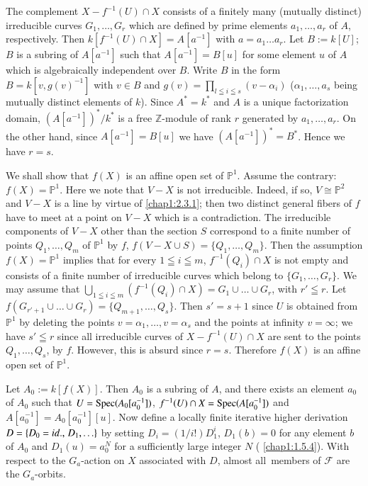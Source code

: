 The complement $X-f^{-1}(U)\cap X$ consists of a finitely many
(mutually distinct) irreducible curves $G_{1},\ldots,G_{r}$ which are
defined by prime elements $a_{1},\ldots,a_{r}$ of $A$,
respectively. Then $k[f^{-1}(U)\cap X]=A[a^{-1}]$ with $a=a_{1}\ldots
a_{r}$. Let $B:=k[U]$; $B$ is a subring of $A[a^{-1}]$ such that
$A[a^{-1}]=B[u]$ for some element $u$ of $A$ which is algebraically
independent over $B$. Write $B$ in the form $B=k[v,g(v)^{-1}]$ with
$v\in B$ and $g(v)=\prod\limits_{l\leqq i\leqq s}(v-\alpha_{i})$
($\alpha_{1},\ldots,a_{s}$ being mutually distinct elements of
$k$). Since $A^{\ast}=k^{\ast}$ and $A$ is a unique factorization
domain, $(A[a^{-1}])^{\ast}/k^{\ast}$ is a free $\mathbb{Z}$-module of
rank $r$ generated by $a_{1},\ldots,a_{r}$. On the other hand, since
$A[a^{-1}]=B[u]$ we have $(A[a^{-1}])^{\ast}=B^{\ast}$. Hence we have
$r=s$.\pageoriginale\ 

We shall show that $f(X)$ is an affine open set of
$\mathbb{P}^{1}$. Assume the contrary: $f(X)=\mathbb{P}^{1}$. Here we
note that $V-X$ is not irreducible. Indeed, if so, $V\cong
\mathbb{P}^{2}$ and $V-X$ is a line by virtue of \ref{chap1:2.3.1}; then two
distinct general fibers of $f$ have to meet at a point on $V-X$ which
is a contradiction. The irreducible components of $V-X$ other than the
section $S$ correspond to a finite number of points
$Q_{1},\ldots,Q_{m}$ of $\mathbb{P}^{1}$ by $f$, \iec $f(V-X\cup
S)=\{Q_{1},\ldots,Q_{m}\}$. Then the assumption $f(X)=\mathbb{P}^{1}$
implies that for every $1\leqq i\leqq m$, $f^{-1}(Q_{i})\cap X$ is not
empty and consists of a finite number of irreducible curves which
belong to $\{G_{1},\ldots,G_{r}\}$. We may assume that
$\bigcup\limits_{1\leqq i\leqq m}(f^{-1}(Q_{i})\cap
X)=G_{1}\cup\ldots\cup G_{r}$, with $r'\leqq r$. Let
$f(G_{r'+1}\cup\ldots\cup G_{r})=\{Q_{m+1},\ldots,Q_{s}\}$. Then
$s'=s+1$ since $U$ is obtained from $\mathbb{P}^{1}$ by deleting the
points $v=\alpha_{1},\ldots,v=\alpha_{s}$ and the points at infinity
$v=\infty$; we have $s'\leqq r$ since all irreducible curves of
$X-f^{-1}(U)\cap X$ are sent to the points $Q_{1},\ldots,Q_{s}$, by
$f$. However, this is absurd since $r=s$. Therefore $f(X)$ is an
affine open set of $\mathbb{P}^{1}$.

Let $A_{0}:=k[f(X)]$. Then $A_{0}$ is a subring of $A$, and there
exists an element $a_{0}$ of $A_{0}$ such that
$U=\operatorname{Spec}(A_{0}[a^{-1}_{0}])$, $f^{-1}(U)\cap X=\operatorname{Spec}(A[a^{-1}_{0}])$
and $A[a^{-1}_{0}]=A_{0}[a^{-1}_{0}][u]$. Now define a locally finite
iterative higher derivation $D=\{D_{0}={id.,}\kern.3em D_{1},\ldots\}$ by setting
$D_{i}=(1/i!)D^{i}_{1}$, $D_{1}(b)=0$ for any element $b$ of $A_{0}$
and $D_{1}(u)=a^{N}_{0}$ for a sufficiently large integer $N$ (\cf
\ref{chap1:1.5.4}). With respect to the $G_{a}$-action on $X$
associated with $D$, almost all\pageoriginale\ members of $\mathscr{F}$
are the $G_{a}$-orbits.

